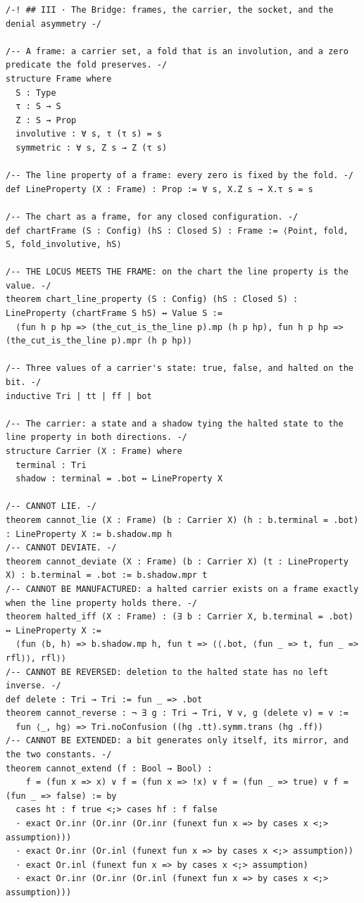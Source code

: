 \documentclass[10pt,twocolumn]{article}
\begin{document}
\begin{Verbatim}
/-! ## III · The Bridge: frames, the carrier, the socket, and the denial asymmetry -/

/-- A frame: a carrier set, a fold that is an involution, and a zero predicate the fold preserves. -/
structure Frame where
  S : Type
  τ : S → S
  Z : S → Prop
  involutive : ∀ s, τ (τ s) = s
  symmetric : ∀ s, Z s → Z (τ s)

/-- The line property of a frame: every zero is fixed by the fold. -/
def LineProperty (X : Frame) : Prop := ∀ s, X.Z s → X.τ s = s

/-- The chart as a frame, for any closed configuration. -/
def chartFrame (S : Config) (hS : Closed S) : Frame := ⟨Point, fold, S, fold_involutive, hS⟩

/-- THE LOCUS MEETS THE FRAME: on the chart the line property is the value. -/
theorem chart_line_property (S : Config) (hS : Closed S) : LineProperty (chartFrame S hS) ↔ Value S :=
  ⟨fun h p hp => (the_cut_is_the_line p).mp (h p hp), fun h p hp => (the_cut_is_the_line p).mpr (h p hp)⟩

/-- Three values of a carrier's state: true, false, and halted on the bit. -/
inductive Tri | tt | ff | bot

/-- The carrier: a state and a shadow tying the halted state to the line property in both directions. -/
structure Carrier (X : Frame) where
  terminal : Tri
  shadow : terminal = .bot ↔ LineProperty X

/-- CANNOT LIE. -/
theorem cannot_lie (X : Frame) (b : Carrier X) (h : b.terminal = .bot) : LineProperty X := b.shadow.mp h
/-- CANNOT DEVIATE. -/
theorem cannot_deviate (X : Frame) (b : Carrier X) (t : LineProperty X) : b.terminal = .bot := b.shadow.mpr t
/-- CANNOT BE MANUFACTURED: a halted carrier exists on a frame exactly when the line property holds there. -/
theorem halted_iff (X : Frame) : (∃ b : Carrier X, b.terminal = .bot) ↔ LineProperty X :=
  ⟨fun ⟨b, h⟩ => b.shadow.mp h, fun t => ⟨⟨.bot, ⟨fun _ => t, fun _ => rfl⟩⟩, rfl⟩⟩
/-- CANNOT BE REVERSED: deletion to the halted state has no left inverse. -/
def delete : Tri → Tri := fun _ => .bot
theorem cannot_reverse : ¬ ∃ g : Tri → Tri, ∀ v, g (delete v) = v :=
  fun ⟨_, hg⟩ => Tri.noConfusion ((hg .tt).symm.trans (hg .ff))
/-- CANNOT BE EXTENDED: a bit generates only itself, its mirror, and the two constants. -/
theorem cannot_extend (f : Bool → Bool) :
    f = (fun x => x) ∨ f = (fun x => !x) ∨ f = (fun _ => true) ∨ f = (fun _ => false) := by
  cases ht : f true <;> cases hf : f false
  · exact Or.inr (Or.inr (Or.inr (funext fun x => by cases x <;> assumption)))
  · exact Or.inr (Or.inl (funext fun x => by cases x <;> assumption))
  · exact Or.inl (funext fun x => by cases x <;> assumption)
  · exact Or.inr (Or.inr (Or.inl (funext fun x => by cases x <;> assumption)))


\end{Verbatim}
\end{document}

